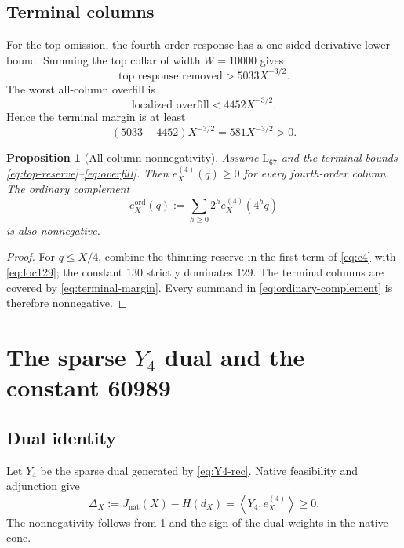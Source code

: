 \documentclass[11pt]{article}
\newtheorem{proposition}[theorem]{Proposition}
\theoremstyle{definition}
\theoremstyle{remark}
\newcommand{\1}{\mathbf 1}
\newcommand{\Nat}{\mathrm{nat}}
\newcommand{\ip}[2]{\left\langle #1,#2\right\rangle}
\begin{document}
\subsection{Terminal columns}

For the top omission, the fourth-order response has a one-sided derivative lower bound.  Summing the top collar of width \(W=10000\) gives
\begin{equation}\label{eq:top-reserve}
\text{top response removed}>5033X^{-3/2}.
\end{equation}
The worst all-column overfill is
\begin{equation}\label{eq:overfill}
\text{localized overfill}<4452X^{-3/2}.
\end{equation}
Hence the terminal margin is at least
\begin{equation}\label{eq:terminal-margin}
(5033-4452)X^{-3/2}=581X^{-3/2}>0.
\end{equation}

\begin{proposition}[All-column nonnegativity]\label{prop:all-column}
Assume \(\mathrm L_{67}\) and the terminal bounds \eqref{eq:top-reserve}--\eqref{eq:overfill}.  Then \(e_X^{(4)}(q)\ge0\) for every fourth-order column.  The ordinary complement
\begin{equation}\label{eq:ordinary-complement}
e_X^{\mathrm{ord}}(q):=\sum_{h\ge0}2^h e_X^{(4)}(4^h q)
\end{equation}
is also nonnegative.
\end{proposition}

\begin{proof}
For \(q\le X/4\), combine the thinning reserve in the first term of \eqref{eq:e4} with \eqref{eq:loc129}; the constant \(130\) strictly dominates \(129\).  The terminal columns are covered by \eqref{eq:terminal-margin}.  Every summand in \eqref{eq:ordinary-complement} is therefore nonnegative.
\end{proof}

\section{The sparse \texorpdfstring{\(Y_4\)}{Y4} dual and the constant 60989}\label{sec:cost}

\subsection{Dual identity}

Let \(Y_4\) be the sparse dual generated by \eqref{eq:Y4-rec}.  Native feasibility and adjunction give
\begin{equation}\label{eq:dual-identity}
\Delta_X:=J_{\Nat}(X)-H(d_X)=\ip{Y_4}{e_X^{(4)}}\ge0.
\end{equation}
The nonnegativity follows from \cref{prop:all-column} and the sign of the dual weights in the native cone.
\end{document}
